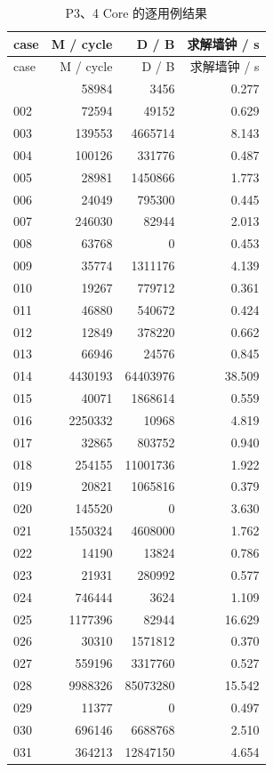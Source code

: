\documentclass[anonymous,notoc]{gmcm2026}
\begin{document}
\begin{longtable}{lrrr}
\caption{P3、4 Core 的逐用例结果}\\
\toprule
case & M / cycle & D / B & 求解墙钟 / s\\\midrule
\endfirsthead
\toprule
case & M / cycle & D / B & 求解墙钟 / s\\\midrule
\endhead
\bottomrule\endfoot
001 & 58984 & 3456 & 0.277 \\
002 & 72594 & 49152 & 0.629 \\
003 & 139553 & 4665714 & 8.143 \\
004 & 100126 & 331776 & 0.487 \\
005 & 28981 & 1450866 & 1.773 \\
006 & 24049 & 795300 & 0.445 \\
007 & 246030 & 82944 & 2.013 \\
008 & 63768 & 0 & 0.453 \\
009 & 35774 & 1311176 & 4.139 \\
010 & 19267 & 779712 & 0.361 \\
011 & 46880 & 540672 & 0.424 \\
012 & 12849 & 378220 & 0.662 \\
013 & 66946 & 24576 & 0.845 \\
014 & 4430193 & 64403976 & 38.509 \\
015 & 40071 & 1868614 & 0.559 \\
016 & 2250332 & 10968 & 4.819 \\
017 & 32865 & 803752 & 0.940 \\
018 & 254155 & 11001736 & 1.922 \\
019 & 20821 & 1065816 & 0.379 \\
020 & 145520 & 0 & 3.630 \\
021 & 1550324 & 4608000 & 1.762 \\
022 & 14190 & 13824 & 0.786 \\
023 & 21931 & 280992 & 0.577 \\
024 & 746444 & 3624 & 1.109 \\
025 & 1177396 & 82944 & 16.629 \\
026 & 30310 & 1571812 & 0.370 \\
027 & 559196 & 3317760 & 0.527 \\
028 & 9988326 & 85073280 & 15.542 \\
029 & 11377 & 0 & 0.497 \\
030 & 696146 & 6688768 & 2.510 \\
031 & 364213 & 12847150 & 4.654 \\

\end{longtable}
\end{document}
